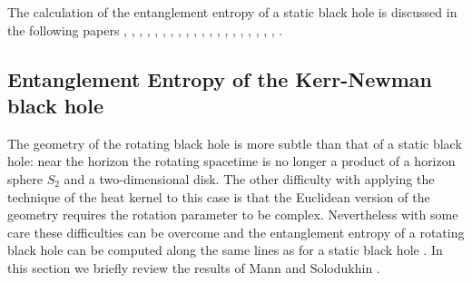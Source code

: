 \documentclass[12pt]{article}
\begin{document}
\medskip

The calculation of the entanglement entropy of a static black hole  is discussed in the following papers 
\cite{Fursaev:1994pq}, \cite{Frolov:1995xe}, \cite{Fursaev:1996uz}, \cite{DeNardo:1996kp}, \cite{Fursaev:1997th}, \cite{Emparan:1994qa}, \cite{Bytsenko:1997ru}, \cite{Zerbini:1996zw},
\cite{Cognola:1995yb}, \cite{Cognola:1995km}, \cite{Cognola:1993qg}, \cite{Iellici:1998np}, \cite{Iellici:1996jx}, \cite{Moretti:1997wi}, \cite{Solodukhin:1994yz}, \cite{Solodukhin:1994st}, \cite{Ghosh:1998bi}, \cite{Ghosh:2002fb}, \cite{Ghosh:1994wb}, \cite{Ghosh:1994mm}, \cite{Ghosh:1997hz}.


\subsection{Entanglement Entropy of the Kerr-Newman black hole}

The  geometry of the rotating black hole is more subtle than that of a static black hole: near the horizon the rotating spacetime is no longer a product of a horizon sphere $S_2$ and a two-dimensional disk.
The other difficulty with applying the technique of the heat kernel to this case is that the Euclidean version of the geometry requires  the rotation parameter to be complex.
Nevertheless with some care these difficulties can be overcome and the entanglement entropy of a rotating black hole can be computed along the same lines as for a static black hole
\cite{Mann:1996bi}. In this section we briefly review the results of Mann and Solodukhin \cite{Mann:1996bi}.
\end{document}
